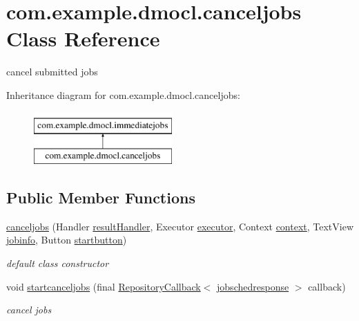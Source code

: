 \hypertarget{classcom_1_1example_1_1dmocl_1_1canceljobs}{}\section{com.\+example.\+dmocl.\+canceljobs Class Reference}
\label{classcom_1_1example_1_1dmocl_1_1canceljobs}


cancel submitted jobs  


Inheritance diagram for com.\+example.\+dmocl.\+canceljobs\+:\begin{figure}[H]
\begin{center}
\leavevmode
\includegraphics[height=2.000000cm]{classcom_1_1example_1_1dmocl_1_1canceljobs}
\end{center}
\end{figure}
\subsection*{Public Member Functions}
\begin{DoxyCompactItemize}
\item 
\mbox{\hyperlink{classcom_1_1example_1_1dmocl_1_1canceljobs_a8a62b3a1ddf01cafbad4e709d9f7b1ea}{canceljobs}} (Handler \mbox{\hyperlink{classcom_1_1example_1_1dmocl_1_1canceljobs_abce3d6cea34caf939e064b0b81ccd9f1}{result\+Handler}}, Executor \mbox{\hyperlink{classcom_1_1example_1_1dmocl_1_1canceljobs_abc0e279999a684fd756e8d4241250daa}{executor}}, Context \mbox{\hyperlink{classcom_1_1example_1_1dmocl_1_1canceljobs_af7ab7e8cec6d942a27672c51a2334d42}{context}}, Text\+View \mbox{\hyperlink{classcom_1_1example_1_1dmocl_1_1canceljobs_a2d2bb74bc844f812fd4f941cfe73e6e0}{jobinfo}}, Button \mbox{\hyperlink{classcom_1_1example_1_1dmocl_1_1canceljobs_a16903bbf6b7cadae2db338457e1f7057}{startbutton}})
\begin{DoxyCompactList}\small\item\em default class constructor \end{DoxyCompactList}\item 
void \mbox{\hyperlink{classcom_1_1example_1_1dmocl_1_1canceljobs_a1b44f0619185399f3b6a4d16f244f1ef}{startcanceljobs}} (final \mbox{\hyperlink{interfacecom_1_1example_1_1dmocl_1_1RepositoryCallback}{Repository\+Callback}}$<$ \mbox{\hyperlink{classcom_1_1example_1_1dmocl_1_1immediatejobs_1_1jobschedresponse}{jobschedresponse}} $>$ callback)
\begin{DoxyCompactList}\small\item\em cancel jobs \end{DoxyCompactList}\end{DoxyCompactItemize}
